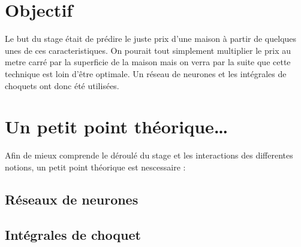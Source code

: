 
\section{Objectif}
\label{sec:obj}

Le but du stage était de prédire le juste prix d'une maison à partir de quelques unes de ces caracteristiques.
On pourait tout simplement multiplier le prix au metre carré par la superficie de la maison
mais on verra par la suite que cette technique est loin d'être optimale.
Un réseau de neurones et les intégrales de choquets ont donc été utilisées.

\section{Un petit point théorique\ldots}
\label{sec:th}
Afin de mieux comprende le déroulé du stage et les interactions des differentes notions,
un petit point théorique est nescessaire :

\subsection{Réseaux de neurones}\label{subsec:réseau-de-neurones}



\subsection{Intégrales de choquet}\label{subsec:intégrales-de-choquet}

